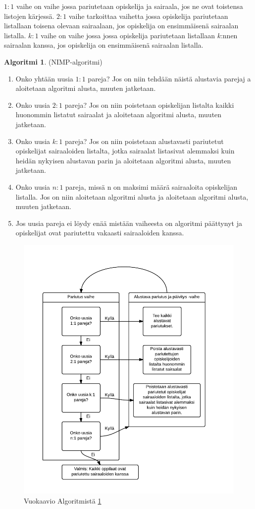 \documentclass[finnish]{tktltiki2}
\theoremstyle{definition}
\newtheorem{alg}[lau]{Algoritmi}
\theoremstyle{remark}
\begin{document}
$1:1$ vaihe on vaihe jossa pariutetaan opiskelija ja sairaala, jos ne ovat toistensa listojen kärjessä. $2:1$ vaihe tarkoittaa vaihetta jossa opiskelija pariutetaan listallaan toisena olevaan sairaalaan, jos opiskelija on ensimmäisenä sairaalan listalla. $k:1$ vaihe on vaihe jossa jossa opiskelija pariutetaan listallaan $k$:nnen sairaalan kanssa, jos opiskelija on ensimmäisenä sairaalan listalla.
\begin{alg} (NIMP-algoritmi) \cite{roth84} \label{nimp}
	\begin{enumerate}
		\item Onko yhtään uusia $1:1$ pareja? Jos on niin tehdään näistä alustavia parejaj a aloitetaan algoritmi alusta, muuten jatketaan.
		\item Onko uusia $2:1$ pareja? Jos on niin poistetaan opiskelijan listalta kaikki huonommin listatut sairaalat ja aloitetaan algoritmi alusta, muuten jatketaan.
		\item Onko uusia $k:1$ pareja? Jos on niin poistetaan alustavasti pariutetut opiskelijat sairaaloiden listalta, jotka sairaalat listasivat alemmaksi kuin heidän nykyisen alustavan parin ja aloitetaan algoritmi alusta, muuten jatketaan.
		\item Onko uusia $n:1$ pareja, missä n on maksimi määrä sairaaloita opiskelijan listalla. Jos on niin aloitetaan algoritmi alusta ja aloitetaan algoritmi alusta, muuten jatketaan.
		\item Jos uusia pareja ei löydy enää mistään vaiheesta on algoritmi päättynyt ja opiskelijat ovat pariutettu vakaasti sairaaloiden kanssa.
	\end{enumerate}
\end{alg}
\begin{figure}[t]
\includegraphics[scale=0.9]{NIMP}
\caption{Vuokaavio Algoritmistä \ref{nimp} \cite[p, 1009]{roth84}}
\end{figure}
\end{document}
